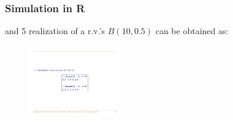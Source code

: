 \documentclass[notes=show,smaller,handout]{beamer}\usepackage[]{graphicx}\usepackage[]{color}
\begin{document}
\begin{frame}
\frametitle{Simulation in R}


and 5 realization of a r.v.'s  $B(10, 0.5)$ can be obtained as:

\medskip

\begin{center} %
\begin{figure}[ptb]\centering
\includegraphics[width=0.35\textwidth,height=0.3\textheight]{img/sim2.pdf}
\end{figure}

\end{center}
\end{frame}
\end{document}
